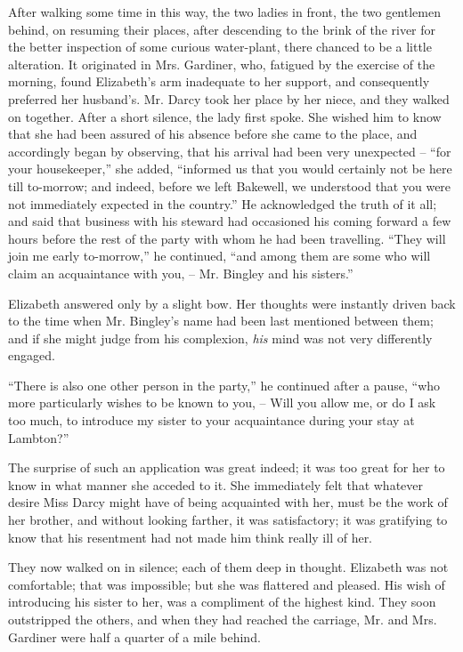 After walking some time in this way, the two ladies in
front, the two gentlemen behind, on resuming their places,
after descending to the brink of the river for the better
inspection of some curious water-plant, there chanced to
be a little alteration. It originated in Mrs. Gardiner, who,
fatigued by the exercise of the morning, found Elizabeth’s
arm inadequate to her support, and consequently preferred
her husband’s. Mr. Darcy took her place by her niece, and
they walked on together. After a short silence, the lady
first spoke. She wished him to know that she had been
assured of his absence before she came to the place, and
accordingly began by observing, that his arrival had been
very unexpected -- “for your housekeeper,” she added,
“informed us that you would certainly not be here till
to-morrow; and indeed, before we left Bakewell, we understood
that you were not immediately expected in the
country.” He acknowledged the truth of it all; and said
that business with his steward had occasioned his coming
forward a few hours before the rest of the party with
whom he had been travelling. “They will join me early
to-morrow,” he continued, “and among them are some
who will claim an acquaintance with you, -- Mr. Bingley
and his sisters.”

Elizabeth answered only by a slight bow. Her thoughts
were instantly driven back to the time when Mr. Bingley’s
name had been last mentioned between them; and if she
might judge from his complexion, \textit{his} mind was not very
differently engaged.

“There is also one other person in the party,” he continued
after a pause, “who more particularly wishes to
be known to you, -- Will you allow me, or do I ask too
much, to introduce my sister to your acquaintance during
your stay at Lambton?”

The surprise of such an application was great indeed;
it was too great for her to know in what manner she
acceded to it. She immediately felt that whatever desire
Miss Darcy might have of being acquainted with her,
must be the work of her brother, and without looking
farther, it was satisfactory; it was gratifying to know that
his resentment had not made him think really ill of her.

They now walked on in silence; each of them deep in
thought. Elizabeth was not comfortable; that was
impossible; but she was flattered and pleased. His wish
of introducing his sister to her, was a compliment of the
highest kind. They soon outstripped the others, and
when they had reached the carriage, Mr. and Mrs. Gardiner
were half a quarter of a mile behind.

